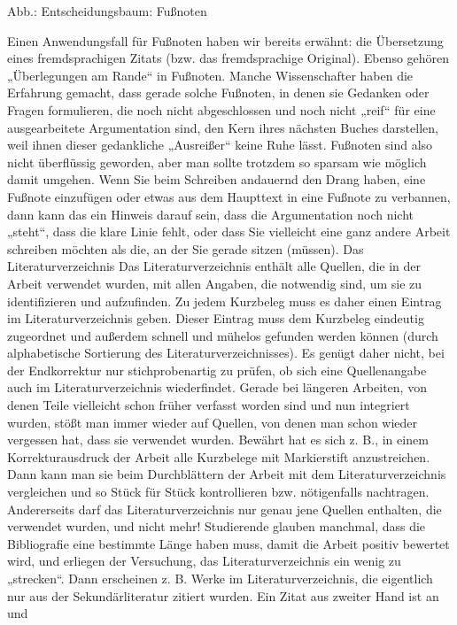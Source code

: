 \documentclass[]{book}
\theoremstyle{definition}
\theoremstyle{definition}
\theoremstyle{definition}
\theoremstyle{remark}
\begin{document}
Abb.: Entscheidungsbaum: Fußnoten

Einen Anwendungsfall für Fußnoten haben wir bereits erwähnt: die
Übersetzung eines fremdsprachigen Zitats (bzw. das fremdsprachige
Original). Ebenso gehören „Überlegungen am Rande`` in Fußnoten. Manche
Wissenschafter haben die Erfahrung gemacht, dass gerade solche Fußnoten,
in denen sie Gedanken oder Fragen formulieren, die noch nicht
abgeschlossen und noch nicht „reif`` für eine ausgearbeitete
Argumentation sind, den Kern ihres nächsten Buches darstellen, weil
ihnen dieser gedankliche „Ausreißer`` keine Ruhe lässt. Fußnoten sind
also nicht überflüssig geworden, aber man sollte trotzdem so sparsam wie
möglich damit umgehen. Wenn Sie beim Schreiben andauernd den Drang
haben, eine Fußnote einzufügen oder etwas aus dem Haupttext in eine
Fußnote zu verbannen, dann kann das ein Hinweis darauf sein, dass die
Argumentation noch nicht „steht``, dass die klare Linie fehlt, oder dass
Sie vielleicht eine ganz andere Arbeit schreiben möchten als die, an der
Sie gerade sitzen (müssen). Das Literaturverzeichnis Das
Literaturverzeichnis enthält alle Quellen, die in der Arbeit verwendet
wurden, mit allen Angaben, die notwendig sind, um sie zu identifizieren
und aufzufinden. Zu jedem Kurzbeleg muss es daher einen Eintrag im
Literaturverzeichnis geben. Dieser Eintrag muss dem Kurzbeleg eindeutig
zugeordnet und außerdem schnell und mühelos gefunden werden können
(durch alphabetische Sortierung des Literaturverzeichnisses). Es genügt
daher nicht, bei der Endkorrektur nur stichprobenartig zu prüfen, ob
sich eine Quellenangabe auch im Literaturverzeichnis wiederfindet.
Gerade bei längeren Arbeiten, von denen Teile vielleicht schon früher
verfasst worden sind und nun integriert wurden, stößt man immer wieder
auf Quellen, von denen man schon wieder vergessen hat, dass sie
verwendet wurden. Bewährt hat es sich z. B., in einem Korrekturausdruck
der Arbeit alle Kurzbelege mit Markierstift anzustreichen. Dann kann man
sie beim Durchblättern der Arbeit mit dem Literaturverzeichnis
vergleichen und so Stück für Stück kontrollieren bzw. nötigenfalls
nachtragen. Andererseits darf das Literaturverzeichnis nur genau jene
Quellen enthalten, die verwendet wurden, und nicht mehr! Studierende
glauben manchmal, dass die Bibliografie eine bestimmte Länge haben muss,
damit die Arbeit positiv bewertet wird, und erliegen der Versuchung, das
Literaturverzeichnis ein wenig zu „strecken``. Dann erscheinen z. B.
Werke im Literaturverzeichnis, die eigentlich nur aus der
Sekundärliteratur zitiert wurden. Ein Zitat aus zweiter Hand ist an und
\end{document}
